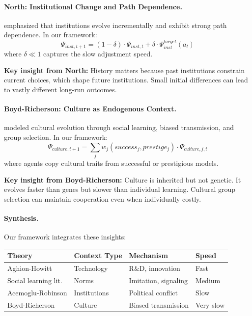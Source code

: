 \documentclass[12pt,a4paper]{article}
\begin{document}
\paragraph{North: Institutional Change and Path Dependence.}
\citet{PAP-north1990institutions} emphasized that institutions evolve incrementally
and exhibit strong path dependence. In our framework:
\begin{equation}
  \Psi_{inst, t+1} = (1 - \delta) \cdot \Psi_{inst, t} + \delta \cdot \Psi_{inst}^{target}(a_t)
\end{equation}
where $\delta \ll 1$ captures the slow adjustment speed.

\textbf{Key insight from North:} History matters because past institutions
constrain current choices, which shape future institutions.
Small initial differences can lead to vastly different long-run outcomes.

\paragraph{Boyd-Richerson: Culture as Endogenous Context.}
\citet{boydricherson} modeled cultural evolution through social learning,
biased transmission, and group selection. In our framework:
\begin{equation}
  \Psi_{culture, t+1} = \sum_j w_j(success_j, prestige_j) \cdot \Psi_{culture, j, t}
\end{equation}
where agents copy cultural traits from successful or prestigious models.

\textbf{Key insight from Boyd-Richerson:} Culture is inherited but not genetic.
It evolves faster than genes but slower than individual learning.
Cultural group selection can maintain cooperation even when individually costly.

\paragraph{Synthesis.}
Our framework integrates these insights:
\begin{center}
\renewcommand{\arraystretch}{1.3}
\begin{tabular}{llll}
\hline
\textbf{Theory} & \textbf{Context Type} & \textbf{Mechanism} & \textbf{Speed} \\
\hline
Aghion-Howitt & Technology & R\&D, innovation & Fast \\
Social learning lit. & Norms & Imitation, signaling & Medium \\
Acemoglu-Robinson & Institutions & Political conflict & Slow \\
Boyd-Richerson & Culture & Biased transmission & Very slow \\
\hline
\end{tabular}
\end{center}
\end{document}
